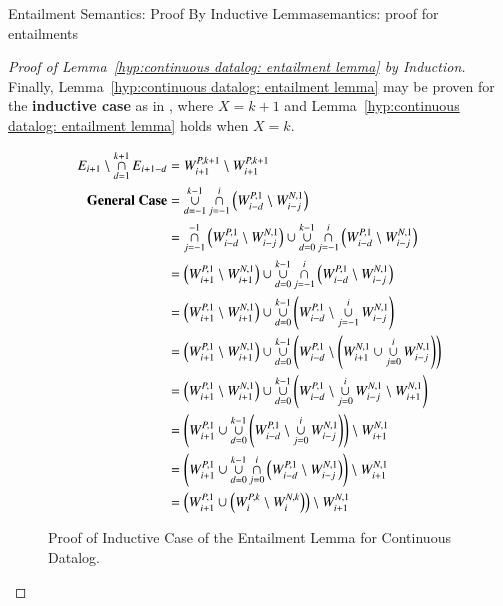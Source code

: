\begin{nestedsection}{Entailment Semantics: Proof By Inductive Lemma}{semantics: proof for entailments}
\begin{proof}[Proof of Lemma~\ref{hyp:continuous datalog: entailment lemma} by Induction]
		Finally, Lemma~\ref{hyp:continuous datalog: entailment lemma} may be proven for the \textbf{inductive case} as in , where ${X = k + 1}$ and Lemma~\ref{hyp:continuous datalog: entailment lemma} holds when ${X = k}$.
		\begin{figure}[p]
			\centering
			\caption[Proof of Entailment Lemma for Continuous Datalog]{Proof of Inductive Case of the Entailment Lemma for Continuous Datalog.}
			\begin{align*}
				E_{i+1} \setminus \mathop{\cap}^{k+1}_{d=1} E_{i+1-d} & = W^{P,k+1}_{i+1} \setminus W^{P,k+1}_{i+1} \\
				\text{\textbf{General Case}} & = \mathop{\cup}^{k-1}_{d=-1}\mathop{\cap}^{i}_{j=-1} \left( W^{P,1}_{i-d} \setminus W^{N,1}_{i-j} \right) \\
				& = \mathop{\cap}^{-1}_{j=-1} \left( W^{P,1}_{i-d} \setminus W^{N,1}_{i-j} \right) \cup \mathop{\cup}^{k-1}_{d=0}\mathop{\cap}^{i}_{j=-1} \left( W^{P,1}_{i-d} \setminus W^{N,1}_{i-j} \right) \\
				& = \left( W^{P,1}_{i+1} \setminus W^{N,1}_{i+1} \right) \cup \mathop{\cup}^{k-1}_{d=0}\mathop{\cap}^{i}_{j=-1} \left( W^{P,1}_{i-d} \setminus W^{N,1}_{i-j} \right) \\
				& = \left( W^{P,1}_{i+1} \setminus W^{N,1}_{i+1} \right) \cup \mathop{\cup}^{k-1}_{d=0} \left( W^{P,1}_{i-d} \setminus \mathop{\cup}^{i}_{j=-1} W^{N,1}_{i-j} \right) \\
				& = \left( W^{P,1}_{i+1} \setminus W^{N,1}_{i+1} \right) \cup \mathop{\cup}^{k-1}_{d=0} \left( W^{P,1}_{i-d} \setminus \left( W^{N,1}_{i+1} \cup \mathop{\cup}^{i}_{j=0} W^{N,1}_{i-j} \right) \right) \\
				& = \left( W^{P,1}_{i+1} \setminus W^{N,1}_{i+1} \right) \cup \mathop{\cup}^{k-1}_{d=0} \left( W^{P,1}_{i-d} \setminus \mathop{\cup}^{i}_{j=0} W^{N,1}_{i-j} \setminus W^{N,1}_{i+1} \right) \\
				& = \left( W^{P,1}_{i+1} \cup \mathop{\cup}^{k-1}_{d=0} \left( W^{P,1}_{i-d} \setminus \mathop{\cup}^{i}_{j=0} W^{N,1}_{i-j} \right) \right) \setminus W^{N,1}_{i+1} \\
				& = \left( W^{P,1}_{i+1} \cup \mathop{\cup}^{k-1}_{d=0}\mathop{\cap}^{i}_{j=0} \left( W^{P,1}_{i-d} \setminus W^{N,1}_{i-j} \right) \right) \setminus W^{N,1}_{i+1} \\
				& = \left( W^{P,1}_{i+1} \cup \left( W^{P,k}_{i} \setminus W^{N,k}_{i} \right) \right) \setminus W^{N,1}_{i+1} \\

\end{align*}
\end{figure}
\end{proof}
\end{nestedsection}
